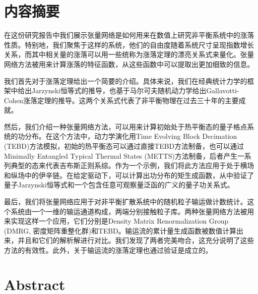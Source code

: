 \chapter{\centering\heiti 内容摘要}


\begin{spacing}{1.5} %
\par 在这份研究报告中我们展示张量网络是如何用来在数值上研究非平衡系统中的涨落性质。特别地，我们聚焦于这样的系统，他们的自由度随着系统尺寸呈现指数增长关系，而其中相关量的涨落可以用一些统称为涨落定理的漂亮关系式来量化。张量网络方法被用来计算涨落的特征函数，从这些函数中可以提取出更加细致的信息。 

\par 我们首先对于涨落定理给出一个简要的介绍。具体来说，我们在经典统计力学的框架中给出Jarzynski恒等式的推导，也基于马尔可夫随机动力学给出Gallavotti-Cohen涨落定理的推导。这两个关系式代表了非平衡物理在过去三十年的主要成就。

\par 然后，我们介绍一种张量网络方法，可以用来计算初始处于热平衡态的量子格点系统的功分布。在这个方法中，动力学演化用Time Evolving Block Decimation (TEBD)方法模拟，初始的热平衡态可以通过直接TEBD方法制备，也可以通过Minimally Entangled Typical Thermal States (METTS)方法制备，后者产生一系列典型的态来代表吉布斯正则系综。作为一个示例，我们将此方法应用于处于横场和纵场中的伊辛链。在给定驱动下，可以计算出功分布的矩生成函数，从中验证了量子Jarzynski恒等式和一个包含任意可观察量泛函的广义的量子功关系式。

\par 最后，我们将张量网络应用于对非平衡扩散系统中的随机粒子输运做计数统计。这个系统由一个一维的输运通道构成，两端分别接触粒子库。两种张量网络方法被用来实现这样一个应用，它们分别是Density Matrix Renormalization Group (DMRG, 密度矩阵重整化群)和TEBD。输运流的累计量生成函数被数值计算出来，并且和它们的解析解进行对比。我们发现了两者完美吻合，这充分说明了这些方法的有效性。此外，关于输运流的涨落定理也通过验证是成立的。
\end{spacing}
\vspace{5mm}







\chapter{Abstract}

